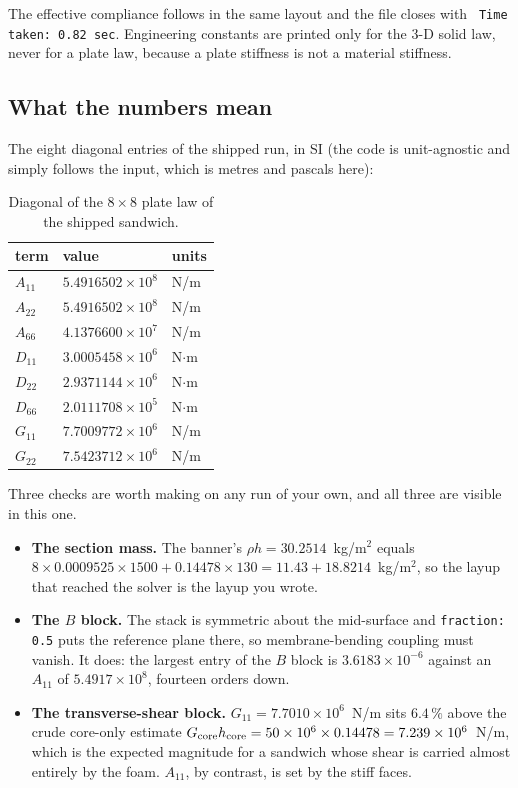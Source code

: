 The effective compliance follows in the same layout and the file closes with
\texttt{ Time taken: 0.82 sec}. Engineering constants are printed only for the
3-D solid law, never for a plate law, because a plate stiffness is not a
material stiffness.

\subsection{What the numbers mean}

The eight diagonal entries of the shipped run, in SI (the code is unit-agnostic
and simply follows the input, which is metres and pascals here):

\begin{table}[htbp]
\centering
\small
\begin{tabular}{lll}
\toprule
term & value & units \\
\midrule
$A_{11}$ & $5.4916502\times10^{8}$ & N/m \\
$A_{22}$ & $5.4916502\times10^{8}$ & N/m \\
$A_{66}$ & $4.1376600\times10^{7}$ & N/m \\
$D_{11}$ & $3.0005458\times10^{6}$ & N$\cdot$m \\
$D_{22}$ & $2.9371144\times10^{6}$ & N$\cdot$m \\
$D_{66}$ & $2.0111708\times10^{5}$ & N$\cdot$m \\
$G_{11}$ & $7.7009772\times10^{6}$ & N/m \\
$G_{22}$ & $7.5423712\times10^{6}$ & N/m \\
\bottomrule
\end{tabular}
\caption{Diagonal of the $8\times8$ plate law of the shipped sandwich.}
\label{tab:solid-ex1diag}
\end{table}

Three checks are worth making on any run of your own, and all three are visible
in this one.

\begin{itemize}
\item \textbf{The section mass.} The banner's $\rho h = 30.2514$~kg/m$^2$ equals
  $8 \times 0.0009525 \times 1500 + 0.14478 \times 130
  = 11.43 + 18.8214$~kg/m$^2$, so the layup that reached the solver is the
  layup you wrote.
\item \textbf{The $B$ block.} The stack is symmetric about the mid-surface and
  \texttt{fraction: 0.5} puts the reference plane there, so membrane-bending
  coupling must vanish. It does: the largest entry of the $B$ block is
  $3.6183\times10^{-6}$ against an $A_{11}$ of $5.4917\times10^{8}$, fourteen
  orders down.
\item \textbf{The transverse-shear block.} $G_{11} = 7.7010\times10^{6}$~N/m
  sits $6.4\,\%$ above the crude core-only estimate
  $G_{\rm core} h_{\rm core} = 50\times10^{6} \times 0.14478
  = 7.239\times10^{6}$~N/m, which is the expected magnitude for a sandwich whose
  shear is carried almost entirely by the foam. $A_{11}$, by contrast, is set by
  the stiff faces.
\end{itemize}

